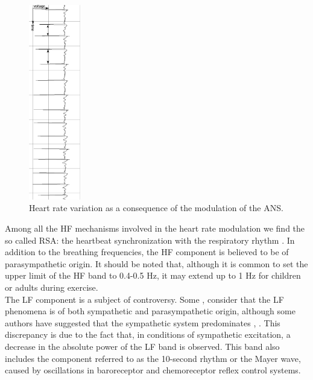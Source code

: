 \documentclass[12pt,lot, lof]{puthesis}
\begin{document}
\begin{figure}[h]
\begin{center}
\includegraphics[width=0.2\textwidth,angle=90]{figures/varhr.pdf}
\caption[Heart rate variation]{\label{Fig:varhr} Heart rate variation as a 
consequence of the modulation of the ANS.}
\end{center}
\end{figure}

Among all the \gls{HF} mechanisms involved in the heart rate modulation we find 
the so called
\gls{RSA}: the heartbeat synchronization with the respiratory rhythm 
\cite{berntson1997}. In addition to the breathing frequencies, the \gls{HF}
component is believed to be of parasympathetic origin. It should be noted that, 
although it is common to set the upper limit of the \gls{HF} band to 0.4-0.5 
Hz, it may extend up to 1 Hz for children or adults during exercise.\\

The \gls{LF} component is a subject of controversy.  Some \cite{akselrod1981}, 
\cite{appel1989beat} consider that the \gls{LF} phenomena is  of both
 sympathetic and parasympathetic origin, although some authors have suggested 
that the sympathetic system predominates \cite{kamath}, \cite{malliani}.
This discrepancy is due to the fact that, in conditions of sympathetic 
excitation, a decrease in the absolute power of the \gls{LF} band is observed. 
This band also includes the component referred
 to as the 10-second rhythm or the Mayer wave, caused by oscillations in 
baroreceptor and chemoreceptor reflex control systems.\\
 
\end{document}
